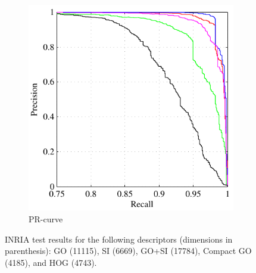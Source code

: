 \documentclass[thesis.tex]{subfiles}
\begin{document}
\begin{figure}[tb]
{\begin{subfigure}[t]{0.593\textwidth}
		\includegraphics[width=\textwidth]{img/inriaTestResultsPR.pdf}
		\caption{PR-curve}
		\label{fig:inriaTestResultsPR}
	\end{subfigure}}
	\caption{INRIA test results for the following descriptors (dimensions in parenthesis): GO (11115), SI (6669), GO+SI (17784), Compact GO (4185), and HOG (4743).}
	\label{fig:inriaTestResults}
\end{figure}
%
\end{document}
